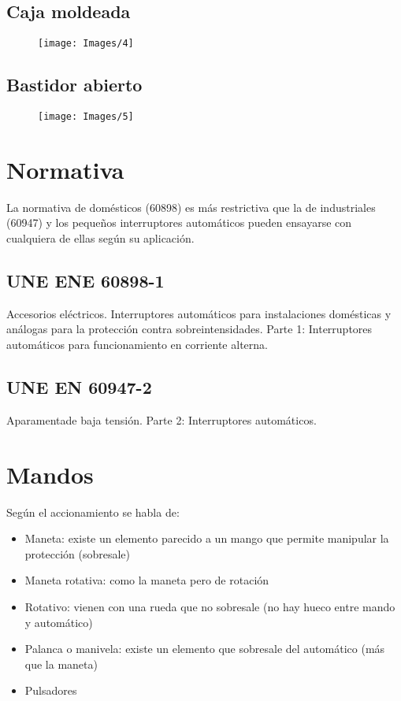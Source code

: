 \subsection{Caja moldeada}
\begin{figure}[H]
	\centering
	\texttt{[image: Images/4]}
	\label{fig:4}
\end{figure}

\subsection{Bastidor abierto}
\begin{figure}[H]
	\centering
	\texttt{[image: Images/5]}
	\label{fig:5}
\end{figure}

\section{Normativa}
La normativa de domésticos (60898) es más restrictiva que la de industriales (60947) y los pequeños interruptores automáticos pueden ensayarse con cualquiera de ellas según su aplicación.
\subsection{UNE ENE 60898-1}
Accesorios eléctricos. Interruptores automáticos para instalaciones domésticas y análogas para la protección contra sobreintensidades. Parte 1: Interruptores automáticos para funcionamiento en corriente alterna.
\subsection{UNE EN 60947-2}
Aparamentade baja tensión. Parte 2: Interruptores automáticos.
\section{Mandos}
Según el accionamiento se habla de:
\begin{itemize}
	\item Maneta: existe un elemento parecido a un mango que permite manipular la protección (sobresale)
	\item Maneta rotativa: como la maneta pero de rotación
	\item Rotativo: vienen con una rueda que no sobresale (no hay hueco entre mando y automático)
	\item Palanca o manivela: existe un elemento que sobresale del automático (más que la maneta)
	\item Pulsadores
\end{itemize}
